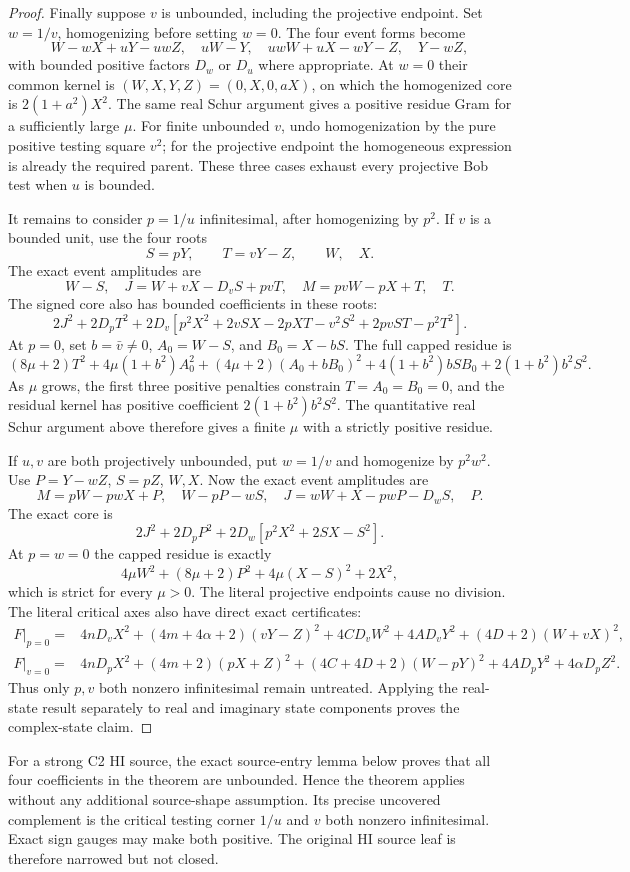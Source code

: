 \begin{proof}
Finally suppose $v$ is unbounded, including the projective
endpoint. Set $w=1/v$, homogenizing before setting $w=0$.
The four event forms become
\[
 W-wX+uY-uwZ,\quad uW-Y,\quad
 uwW+uX-wY-Z,\quad Y-wZ,
\]
with bounded positive factors $D_w$ or $D_u$ where appropriate.
At $w=0$ their common kernel is
$(W,X,Y,Z)=(0,X,0,aX)$, on which the homogenized core is
$2(1+a^2)X^2$. The same real Schur argument gives a positive
residue Gram for a sufficiently large $\mu$.
For finite unbounded $v$, undo homogenization by the pure
positive testing square $v^2$; for the projective endpoint the
homogeneous expression is already the required parent.
These three cases exhaust every projective Bob test when $u$ is bounded.

It remains to consider $p=1/u$ infinitesimal, after homogenizing
by $p^2$. If $v$ is a bounded unit, use the four roots
\[
 S=pY,\qquad T=vY-Z,\qquad W,\quad X.
\]
The exact event amplitudes are
\[
 W-S,\quad J=W+vX-D_vS+pvT,\quad
 M=pvW-pX+T,\quad T.
\]
The signed core also has bounded coefficients in these roots:
\[
 2J^2+2D_pT^2+2D_v
 [p^2X^2+2vSX-2pXT-v^2S^2+2pvST-p^2T^2].
\]
At $p=0$, set $b=\bar v\ne0$, $A_0=W-S$, and
$B_0=X-bS$. The full capped residue is
\[
 (8\mu+2)T^2+4\mu(1+b^2)A_0^2
 +(4\mu+2)(A_0+bB_0)^2
 +4(1+b^2)bSB_0+2(1+b^2)b^2S^2.
\]
As $\mu$ grows, the first three positive penalties constrain
$T=A_0=B_0=0$, and the residual kernel has positive coefficient
$2(1+b^2)b^2S^2$. The quantitative real Schur argument above
therefore gives a finite $\mu$ with a strictly positive residue.

If $u,v$ are both projectively unbounded, put $w=1/v$ and
homogenize by $p^2w^2$. Use $P=Y-wZ$, $S=pZ$, $W,X$.
Now the exact event amplitudes are
\[
 M=pW-pwX+P,\quad W-pP-wS,\quad
 J=wW+X-pwP-D_wS,\quad P.
\]
The exact core is
\[
 2J^2+2D_pP^2+2D_w[p^2X^2+2SX-S^2].
\]
At $p=w=0$ the capped residue is exactly
\[
 4\mu W^2+(8\mu+2)P^2+4\mu(X-S)^2+2X^2,
\]
which is strict for every $\mu>0$. The literal projective
endpoints cause no division. The literal critical axes also have direct exact certificates:
\begin{align*}
 F|_{p=0}={}&4nD_vX^2+(4m+4\alpha+2)(vY-Z)^2
 +4CD_vW^2+4AD_vY^2+(4D+2)(W+vX)^2,\\
 F|_{v=0}={}&4nD_pX^2+(4m+2)(pX+Z)^2
 +(4C+4D+2)(W-pY)^2+4AD_pY^2+4\alpha D_pZ^2.
\end{align*}
Thus only $p,v$ both nonzero infinitesimal remain untreated.
Applying the real-state result separately to real and imaginary
state components proves the complex-state claim.
\end{proof}

For a strong C2 HI source, the exact source-entry lemma below proves
that all four coefficients in the theorem are unbounded. Hence the
theorem applies without any additional source-shape assumption.
Its precise uncovered complement is the critical testing corner
$1/u$ and $v$ both nonzero infinitesimal. Exact sign gauges may
make both positive.
The original HI source leaf is therefore narrowed but not closed.

